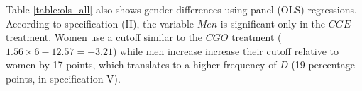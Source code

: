 \documentclass[11pt, letterpaper]{article}
\theoremstyle{plain}
\begin{document}
Table \ref{table:ols_all} also shows gender differences using panel (OLS) regressions. According to specification (II), the variable $Men$ is significant only in the $CGE$ treatment. Women use a cutoff similar to the $CGO$ treatment ($1.56\times 6-12.57= -3.21$) while men increase increase their cutoff relative to women by 17 points, which translates to a higher frequency of $D$ (19 percentage points, in specification V).
\begin{center}
\begin{figure}[ht]
\centering{}%
\begin{minipage}[t]{0.45\columnwidth}%
%
\end{minipage}%
\begin{minipage}[t]{0.45\columnwidth}%
%

\end{minipage}
\end{figure}
\end{center}
\end{document}
